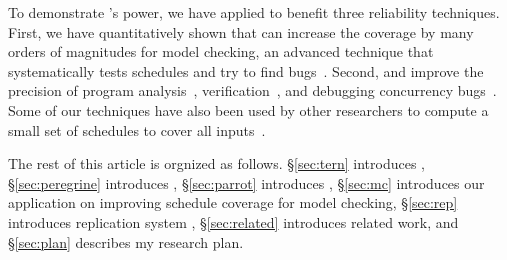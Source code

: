 



To demonstrate \smt's power, we have applied \smt to benefit three reliability techniques. First, we have quantitatively shown that \smt can increase the coverage by many orders of magnitudes for model checking, an advanced technique that systematically tests schedules and try to find bugs~\cite{parrot:sosp13, dbug:spin11, modist:nsdi09}. Second, and improve the precision of program analysis~\cite{wu:pldi12}, verification~\cite{wu:pldi12}, and debugging concurrency bugs~\cite{cui:tern:osdi10}. Some of our \smt techniques have also been used by other researchers to compute a small set of schedules to cover all inputs~\cite{bergan:oopsla13}.

The rest of this article is orgnized as follows. \S\ref{sec:tern} introduces \tern, 
\S\ref{sec:peregrine} introduces 
\peregrine, \S\ref{sec:parrot} introduces \parrot, \S\ref{sec:mc} introduces our 
application on improving schedule coverage for model checking,
\S\ref{sec:rep} introduces replication system \msmr, \S\ref{sec:related} introduces 
related work, and \S\ref{sec:plan} describes my research plan.

